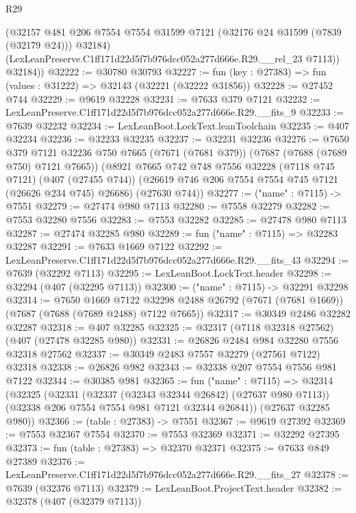 \begin{lexlean}{R29}
\begin{coremodule}
          (@32157
            @481
            @206
            @7554
            @7554
            @31599
            @7121
            (@32176 @24 @31599 (@7839 (@32179 @24)))
            @32184)
          (LexLeanPreserve.C1ff171d22d5f7b976dcc052a277d666e.R29.__rel_23 @7113))
        @32184))
@32222 := @30780 @30793
@32227 := fun (key : @27383) => fun (values : @31222) => @32143 (@32221 (@32222 @31856))
@32228 := @27452 @744
@32229 := @9619 @32228
@32231 := @7633 @379 @7121
@32232 := LexLeanPreserve.C1ff171d22d5f7b976dcc052a277d666e.R29.__fits_9
@32233 := @7639 @32232
@32234 := LexLeanBoot.LockText.leanToolchain
@32235 := @407 @32234
@32236 := @32233 @32235
@32237 := @32231 @32236
@32276 := @7650
    @379
    @7121
    @32236
    @750
    @7665
    (@7671 (@7681 @379))
    (@7687 (@7688 (@7689 @750) @7121 @7665))
    (@8921
      @7665
      @742
      @748
      @7556
      @32228
      (@7118 @745 @7121)
      (@407 (@27455 @744))
      (@26619 @746 @206 @7554 @7554 @745 @7121 (@26626 @234 @745) @26686)
      (@27630 @744))
@32277 := ("name" : @7115) -> @7551
@32279 := @27474 @980 @7113
@32280 := @7558 @32279
@32282 := @7553 @32280 @7556
@32283 := @7553 @32282
@32285 := @27478 @980 @7113
@32287 := @27474 @32285 @980
@32289 := fun ("name" : @7115) => @32283 @32287
@32291 := @7633 @1669 @7122
@32292 := LexLeanPreserve.C1ff171d22d5f7b976dcc052a277d666e.R29.__fits_43
@32294 := @7639 (@32292 @7113)
@32295 := LexLeanBoot.LockText.header
@32298 := @32294 (@407 (@32295 @7113))
@32300 := ("name" : @7115) -> @32291 @32298
@32314 := @7650
    @1669
    @7122
    @32298
    @2488
    @26792
    (@7671 (@7681 @1669))
    (@7687 (@7688 (@7689 @2488) @7122 @7665))
@32317 := @30349 @2486 @32282 @32287
@32318 := @407 @32285
@32325 := @32317 (@7118 @32318 @27562) (@407 (@27478 @32285 @980))
@32331 := @26826 @2484 @984 @32280 @7556 @32318 @27562
@32337 := @30349 @2483 @7557 @32279 (@27561 @7122) @32318
@32338 := @26826 @982
@32343 := @32338 @207 @7554 @7556 @981 @7122
@32344 := @30385 @981
@32365 := fun ("name" : @7115) =>
  @32314
    (@32325
      (@32331
        (@32337 (@32343 @32344 @26842) (@27637 @980 @7113))
        (@32338 @206 @7554 @7554 @981 @7121 @32344 @26841))
      (@27637 @32285 @980))
@32366 := (table : @27383) -> @7551
@32367 := @9619 @27392
@32369 := @7553 @32367 @7554
@32370 := @7553 @32369
@32371 := @32292 @27395
@32373 := fun (table : @27383) => @32370 @32371
@32375 := @7633 @849 @27389
@32376 := LexLeanPreserve.C1ff171d22d5f7b976dcc052a277d666e.R29.__fits_27
@32378 := @7639 (@32376 @7113)
@32379 := LexLeanBoot.ProjectText.header
@32382 := @32378 (@407 (@32379 @7113))

\end{coremodule}
\end{lexlean}
